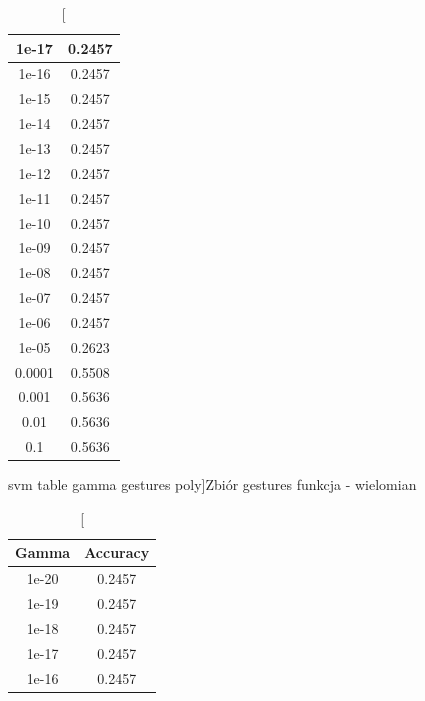 \documentclass{classrep}
\begin{document}
{{\begin{table}[!htbp]
\begin{minipage}{.35\textwidth}
\begin{tabular}{|c|c|}
                        1e-17 & 0.2457 \\ \hline
                        1e-16 & 0.2457 \\ \hline
                        1e-15 & 0.2457 \\ \hline
                        1e-14 & 0.2457 \\ \hline
                        1e-13 & 0.2457 \\ \hline
                        1e-12 & 0.2457 \\ \hline
                        1e-11 & 0.2457 \\ \hline
                        1e-10 & 0.2457 \\ \hline
                        1e-09 & 0.2457 \\ \hline
                        1e-08 & 0.2457 \\ \hline
                        1e-07 & 0.2457 \\ \hline
                        1e-06 & 0.2457 \\ \hline
                        1e-05 & 0.2623 \\ \hline
                        0.0001 & 0.5508 \\ \hline
                        0.001 & 0.5636 \\ \hline
                        0.01 & 0.5636 \\ \hline
                        0.1 & 0.5636 \\ \hline
                    \end{tabular}
                    \caption
                    [svm table gamma gestures poly]{Zbiór gestures funkcja - wielomian}
                    \label{svn_table_gamma_gestures_poly}
                \end{minipage}
                \hfill
                \begin{minipage}{.3\textwidth}
                    \centering
                    \begin{tabular}{|c|c|}
                        \hline
                        Gamma & Accuracy \\ \hline
                        1e-20 & 0.2457 \\ \hline
                        1e-19 & 0.2457 \\ \hline
                        1e-18 & 0.2457 \\ \hline
                        1e-17 & 0.2457 \\ \hline
                        1e-16 & 0.2457 \\ \hline

\end{tabular}
\end{minipage}
\end{table}}}
\end{document}
